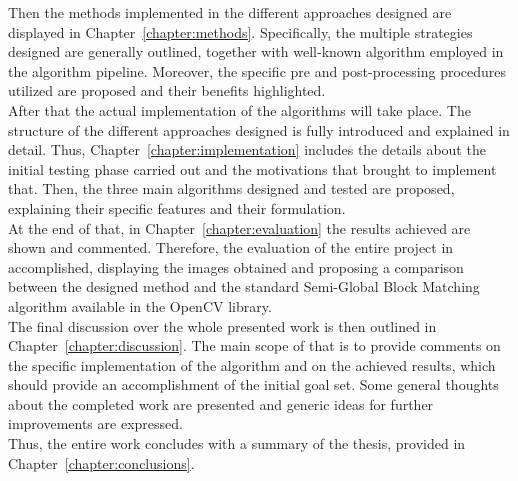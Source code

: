 Then the methods implemented in the different approaches designed are displayed in Chapter~\ref{chapter:methods}. 
Specifically, the multiple strategies designed are generally outlined, together with well-known algorithm employed in the algorithm pipeline.
Moreover, the specific pre and post-processing procedures utilized are proposed and their benefits highlighted. \\ 
After that the actual implementation of the algorithms will take place. 
The structure of the different approaches designed is fully introduced and explained in detail.
Thus, Chapter~\ref{chapter:implementation} includes the details about the initial testing phase carried out and the motivations that brought to implement that. 
Then, the three main algorithms designed and tested are proposed, explaining their specific features and their formulation.\\
At the end of that, in Chapter~\ref{chapter:evaluation} the results achieved are shown and commented.
Therefore, the evaluation of the entire project in accomplished, displaying the images obtained and proposing a comparison between the designed method and the standard Semi-Global Block Matching algorithm available in the OpenCV library. \\
The final discussion over the whole presented work is then outlined in Chapter~\ref{chapter:discussion}.
The main scope of that is to provide comments on the specific implementation of the algorithm and on the achieved results, which should provide an accomplishment of the initial goal set.
Some general thoughts about the completed work are presented and generic ideas for further improvements are expressed.\\
Thus, the entire work concludes with a summary of the thesis, provided in Chapter~\ref{chapter:conclusions}.


